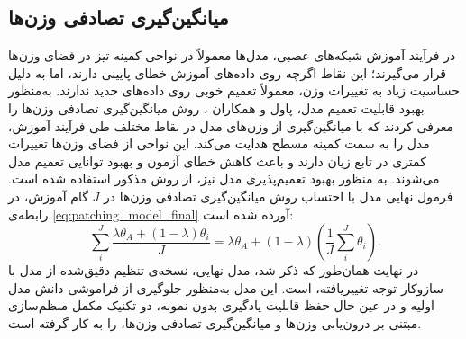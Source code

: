 \subsection{میانگین‌گیری تصادفی وزن‌ها}
در فرآیند آموزش شبکه‌های عصبی، مدل‌ها معمولاً در نواحی کمینه تیز در فضای وزن‌ها قرار می‌گیرند؛ این نقاط اگرچه روی داده‌های آموزش خطای پایینی دارند، اما به دلیل حساسیت زیاد به تغییرات وزن، معمولاً تعمیم خوبی روی داده‌های جدید ندارند. به‌منظور بهبود قابلیت تعمیم مدل، پاول و همکاران \cite{flat-min}، روش میانگین‌گیری تصادفی وزن‌ها را معرفی کردند که با میانگین‌گیری از وزن‌های مدل در نقاط مختلف طی فرآیند آموزش، مدل را به سمت کمینه مسطح هدایت می‌کند. این نواحی از فضای وزن‌ها تغییرات کمتری در تابع زیان دارند و باعث کاهش خطای آزمون و بهبود توانایی تعمیم مدل می‌شوند. به منظور بهبود تعمیم‌پذیری مدل  نیز، از روش مذکور استفاده شده است. فرمول نهایی مدل   با احتساب روش میانگین‌گیری تصادفی وزن‌ها در $J$ گام آموزش، در رابطه‌ی \eqref{eq:patching_model_final} آورده شده است:
\begin{equation}\label{eq:patching_model_final}
	\sum_{i}^{J} \frac{\lambda \theta_{A} + (1 - \lambda) \theta_{i}}{J}
	= \lambda \theta_{A} + (1 - \lambda)
	\left( \frac{1}{J} \sum_{i}^{J} \theta_{i} \right).
\end{equation}
در نهایت همان‌طور که ذکر شد، مدل  نهایی، نسخه‌ی تنظیم دقیق‌شده از مدل  با سازوکار توجه تغییر‌یافته، است. این مدل به‌منظور جلوگیری از فراموشی دانش مدل اولیه و در عین حال حفظ قابلیت یادگیری بدون نمونه، دو تکنیک مکمل منظم‌سازی مبتنی بر درون‌یابی وزن‌ها و میانگین‌گیری تصادفی وزن‌ها، را به کار گرفته است.
